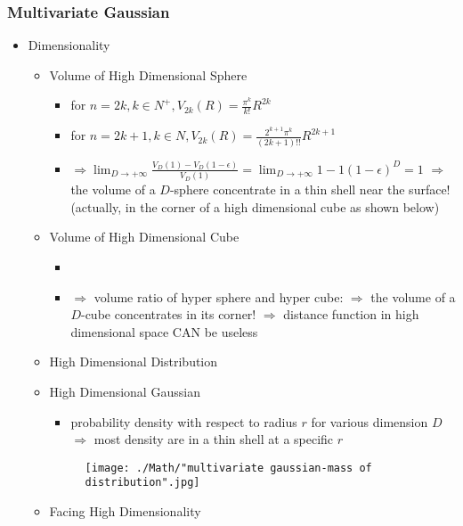 \subsubsection{Multivariate Gaussian}
\begin{itemize}
\item Dimensionality
	\begin{itemize}
	\item Volume of High Dimensional Sphere
		\begin{itemize}
		\item for $n=2k, k\in N^+, V_{2k}(R) = \frac {\pi^k}{k!} R^{2k}$ 
		\item for $n=2k+1, k\in N, V_{2k}(R) = \frac {2^{k+1}\pi^k}{(2k+1)!!} R^{2k+1}$ 
		\item $\displaystyle \Rightarrow \lim_{D\rightarrow+\infty} \frac {V_D(1)-V_D(1-\epsilon)}{V_D(1)} = \lim_{D\rightarrow+\infty}1-1(1-\epsilon)^D = 1$
			$\Rightarrow$ the volume of a $D$-sphere concentrate in a thin shell near the surface! \\
			(actually, in the corner of a high dimensional cube as shown below)
		\end{itemize}
	\item Volume of High Dimensional Cube
		\begin{itemize}
		\item 
		\item $\Rightarrow$ volume ratio of hyper sphere and hyper cube: 
		$\Rightarrow$ the volume of a $D$-cube concentrates in its corner!
		$\Rightarrow$ distance function in high dimensional space CAN be useless
		\end{itemize}
	\item High Dimensional Distribution
	\item High Dimensional Gaussian
		\begin{itemize}
		\item probability density with respect to radius $r$ for various dimension $D$ \\
			$\Rightarrow$ most density are in a thin shell at a specific $r$			
		\end{itemize}
		\begin{figure}[ht]
		\texttt{[image: ./Math/"multivariate gaussian-mass of distribution".jpg]}
		\end{figure}
	\item Facing High Dimensionality
	\end{itemize}
\end{itemize}

